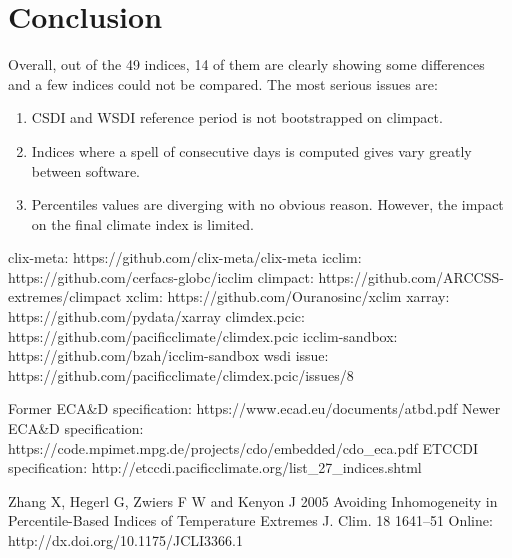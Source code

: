 \documentclass[a4paper,11pt]{article}
\begin{document}
\part{Conclusion}
    Overall, out of the 49 indices, 14 of them are clearly showing some differences and a few indices could not be compared.
    The most serious issues are:
    \begin{enumerate}
        \item CSDI and WSDI reference period is not bootstrapped on climpact.
        \item Indices where a spell of consecutive days is computed gives vary greatly between software.
        \item Percentiles values are diverging with no obvious reason. However, the impact on the final climate index is limited.
    \end{enumerate}

\begin{thebibliography}{10}
        clix-meta: https://github.com/clix-meta/clix-meta
        icclim: https://github.com/cerfacs-globc/icclim
        climpact: https://github.com/ARCCSS-extremes/climpact
        xclim: https://github.com/Ouranosinc/xclim
        xarray: https://github.com/pydata/xarray
        climdex.pcic: https://github.com/pacificclimate/climdex.pcic    
        icclim-sandbox: https://github.com/bzah/icclim-sandbox
        wsdi issue: https://github.com/pacificclimate/climdex.pcic/issues/8
        
        Former ECA\&D specification: https://www.ecad.eu/documents/atbd.pdf
        Newer ECA\&D specification: https://code.mpimet.mpg.de/projects/cdo/embedded/cdo\_eca.pdf
        ETCCDI specification: http://etccdi.pacificclimate.org/list\_27\_indices.shtml

        Zhang X, Hegerl G, Zwiers F W and Kenyon J 2005 Avoiding Inhomogeneity in Percentile-Based Indices of Temperature Extremes J. Clim. 18 1641–51 Online: http://dx.doi.org/10.1175/JCLI3366.1
\end{thebibliography}
\end{document}
